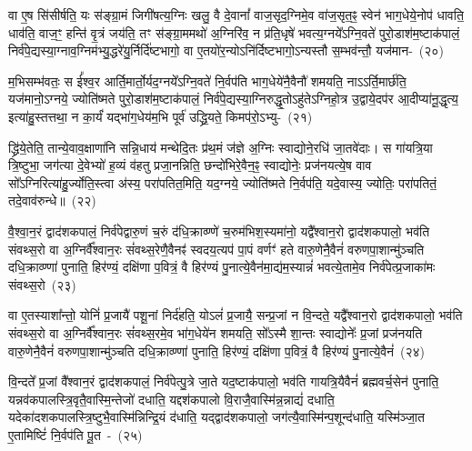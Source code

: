 वा ए॒ष सि॑सीर्\mbox{}षति॒ यः स॑ङ्ग्रा॒मं जिगी॑षत्य॒ग्निः खलु॒ वै दे॒वानां᳚ वाज॒सृद॒ग्निमे॒व वा॑ज॒सृत॒ꣴ॒ स्वेन॑ भाग॒\-धेये॒नोप॑ धावति॒ धाव॑ति॒ वाज॒ꣳ॒ हन्ति॑ वृ॒त्रं जय॑ति॒ तꣳ स॑ङ्ग्रा॒ममथो॑ अ॒ग्निरि॑व॒ न प्र॑ति॒धृषे॑ भवत्य॒ग्नये᳚\-ऽग्नि॒वते॑ पुरो॒डाश॑\-म॒ष्टा\-क॑पालं॒ निर्व॑पे॒द्यस्या॒ग्नाव॒ग्निम॑भ्यु॒द्धरे॑यु॒र्निर्दि॑ष्टभागो॒ वा ए॒तयो॑र॒न्यो\-ऽनि॑र्दिष्टभागो॒\-ऽन्यस्तौ स॒म्भव॑न्तौ॒ यज॑मान-~(२०)\ip

म॒भिसम्भ॑वतः॒ स ई᳚श्व॒र आर्ति॒मार्तो॒र्यद॒ग्नये᳚\-ऽग्नि॒वते॑ नि॒र्वप॑ति भाग॒\-धेये॑नै॒वैनौ॑ शमयति॒ नाऽऽर्ति॒मार्छ॑ति॒ यज॑मानो॒\-ऽग्नये॒ ज्योति॑ष्मते पुरो॒डाश॑\-म॒ष्टा\-क॑पालं॒ निर्व॑पे॒द्यस्या॒ग्निरुद्धृ॒तो\-ऽहु॑ते\-ऽग्निहो॒त्र उ॒द्वाये॒दप॑र आ॒दीप्या॑नू॒द्धृत्य॒ इत्या॑हु॒स्तत्तथा॒ न का॒र्यं॑ यद्भा॑ग॒धेय॑म॒भि पूर्व॑ उद्ध्रि॒यते॒ किमप॑रो॒\-ऽभ्यु-~(२१)\ip

द्ध्रि॑ये॒तेति॒ तान्ये॒वाव॒क्षाणा॑नि सन्नि॒धाय॑ मन्थेदि॒तः प्र॑थ॒मं ज॑ज्ञे अ॒ग्निः स्वाद्योने॒रधि॑ जा॒तवे॑दाः। स गा॑यत्रि॒या त्रि॒ष्टुभा॒ जग॑त्या दे॒वेभ्यो॑ ह॒व्यं व॑हतु प्रजा॒नन्निति॒ छन्दो॑भिरे॒वैन॒ꣴ॒ स्वाद्योनेः॒ प्रज॑नयत्ये॒ष वाव सो᳚\-ऽग्निरित्या॑हु॒र्ज्योति॒स्त्वा अ॑स्य॒ परा॑पतित॒मिति॒ यद॒ग्नये॒ ज्योति॑ष्मते नि॒र्वप॑ति॒ यदे॒वास्य॒ ज्योतिः॒ परा॑पतितं॒ तदे॒\-वाव॑\-रुन्धे॥~(२२)\ip

{\anuvakamend[{क॒रो॒त्य॒न्ना॒दो द॑धाति॒ यद॒ग्नये॒ शुच॑ये॒ चक्षु॑रे॒वास्मि॒न्तेन॑ दधाति करोति॒ वाजं॒ यज॑मान॒मुदे॒वास्य॒ षट्च॑}]}

वै॒श्वा॒न॒रं द्वाद॑श\-कपालं॒ निर्व॑पेद्वारु॒णं च॒रुं द॑धि॒क्राव्ण्णे॑ च॒रुम॑भिश॒स्यमा॑नो॒ यद्वै᳚श्वान॒रो द्वाद॑श\-कपालो॒ भव॑ति संवथ्स॒रो वा अ॒ग्निर्वै᳚श्वान॒रः सं॑वथ्स॒रेणै॒वैनꣴ॑ स्वदय॒त्यप॑ पा॒पं वर्णꣳ॑ हते वारु॒णेनै॒वैनं॑ वरुणपा॒शान्मु॑ञ्चति दधि॒क्राव्ण्णा॑ पुनाति॒ हिर॑ण्यं॒ दक्षि॑णा प॒वित्रं॒ वै हिर॑ण्यं पु॒नात्ये॒वैन॑मा॒द्य॑म॒स्यान्नं॑ भवत्ये॒तामे॒व निर्व॑पेत्प्र॒जाका॑मः संवथ्स॒रो~(२३)\ip

वा ए॒तस्याशा᳚न्तो॒ योनिं॑ प्र॒जायै॑ पशू॒नां निर्द॑हति॒ यो\-ऽलं॑ प्र॒जायै॒ सन्प्र॒जां न वि॒न्दते॒ यद्वै᳚श्वान॒रो द्वाद॑श\-कपालो॒ भव॑ति संवथ्स॒रो वा अ॒ग्निर्वै᳚श्वान॒रः सं॑वथ्स॒रमे॒व भा॑ग॒धेये॑न शमयति॒ सो᳚\-ऽस्मै शा॒न्तः स्वाद्योनेः᳚ प्र॒जां प्रज॑नयति वारु॒णेनै॒वैनं॑ वरुणपा॒शान्मु॑ञ्चति दधि॒क्राव्ण्णा॑ पुनाति॒ हिर॑ण्यं॒ दक्षि॑णा प॒वित्रं॒ वै हिर॑ण्यं पु॒नात्ये॒वैनं॑~(२४)\ip

वि॒न्दते᳚ प्र॒जां वै᳚श्वान॒रं द्वाद॑श\-कपालं॒ निर्व॑पेत्पु॒त्रे जा॒ते यद॒ष्टाक॑पालो॒ भव॑ति गायत्रि॒यैवैनं॑ ब्रह्मवर्च॒सेन॑ पुनाति॒ यन्नव॑कपालस्त्रि॒वृतै॒वास्मि॒न्तेजो॑ दधाति॒ यद्दश॑\-कपालो वि॒राजै॒वास्मि॑न्न॒न्नाद्यं॑ दधाति॒ यदेका॑\-दश\-कपालस्त्रि॒ष्टुभै॒वा\-स्मि॑न्निन्द्रि॒यं द॑धाति॒ यद्द्वाद॑श\-कपालो॒ जग॑त्यै॒वास्मि॑न्प॒शून्द॑\-धाति॒ यस्मि॑ञ्जा॒त ए॒तामिष्टिं॑ नि॒र्वप॑ति पू॒त~-~(२५)\ip

